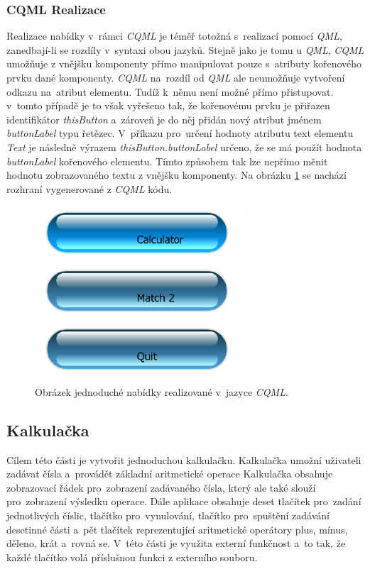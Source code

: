 \documentclass[11pt,twoside,a4paper]{book}
\begin{document}
\subsubsection{\label{SEC:CQMLMenu}CQML Realizace}
Realizace nabídky v~rámci \textit{CQML} je téměř totožná s~realizací pomocí \textit{QML}, zanedbají-li se rozdíly v~syntaxi obou jazyků.
Stejně jako je tomu u \textit{QML}, \textit{CQML} umožňuje z vnějšku komponenty přímo manipulovat pouze s~atributy kořenového prvku dané komponenty. \textit{CQML} na~rozdíl od \textit{QML} ale neumožňuje vytvoření odkazu na~atribut elementu. Tudíž k~němu není možné přímo přistupovat.  v~tomto případě je to však vyřešeno tak, že kořenovému prvku je přiřazen identifikátor \textit{thisButton} a~zároveň je do něj přidán nový atribut jménem \textit{buttonLabel} typu řetězec. V~příkazu pro~určení hodnoty atributu text elementu \textit{Text} je následně výrazem \textit{thisButton.buttonLabel} určeno, že se má použít hodnota \textit{buttonLabel} kořenového elementu. Tímto způsobem tak lze nepřímo měnit hodnotu zobrazovaného textu z vnějšku komponenty. Na obrázku \ref{fig:outMenuCQML} se nachází rozhraní vygenerované z \textit{CQML} kódu.
\begin{figure}[!ht]
\begin{center}
  \includegraphics[width=0.7\textwidth]{figures/cqmlMenu}
\caption{{\label{fig:outMenuCQML}}Obrázek jednoduché nabídky realizované v~jazyce \textit{CQML}.}
\end{center}
\end{figure}

\subsection{Kalkulačka}
Cílem této části je vytvořit jednoduchou kalkulačku. Kalkulačka umožní uživateli zadávat čísla a~provádět základní aritmetické operace Kalkulačka obsahuje zobrazovací řádek pro~zobrazení zadávaného čísla, který ale také slouží pro~zobrazení výsledku operace. Dále aplikace obsahuje deset tlačítek pro~zadání jednotlivých číslic, tlačítko pro~vynulování, tlačítko pro~spuštění zadávání desetinné části a~pět tlačítek reprezentující aritmetické operátory plus, mínus, děleno, krát a~rovná se. V~této části je využita externí funkčnost a~to tak, že každé tlačítko volá příslušnou funkci z externího souboru.
\end{document}
